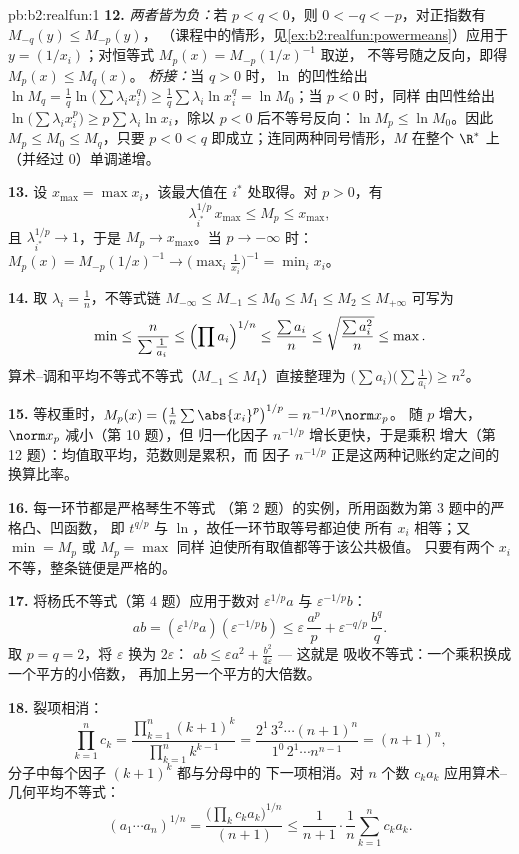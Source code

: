 \begin{solution}{pb:b2:realfun:1}
\textbf{12.} \emph{两者皆为负：}若 $p < q < 0$，则 $0 < -q <
-p$，对正指数有 $M_{-q}(y) \leq M_{-p}(y)$，
（课程中的情形，见\cref{ex:b2:realfun:powermeans}）应用于 $y =
(1/x_i)$；对恒等式 $M_p(x) = M_{-p}(1/x)^{-1}$ 取逆，
不等号随之反向，即得 $M_p(x) \leq M_q(x)$。
\emph{桥接：}当 $q > 0$ 时，$\ln$ 的凹性给出 $\ln M_q =
\frac1q\ln\bigl(\sum\lambda_ix_i^q\bigr) \geq
\frac1q\sum\lambda_i\ln x_i^q = \ln M_0$；当 $p < 0$ 时，同样
由凹性给出 $\ln\bigl(\sum\lambda_ix_i^p\bigr) \geq
p\sum\lambda_i\ln x_i$，除以 $p < 0$ 后不等号反向：$\ln M_p
\leq \ln M_0$。因此 $M_p \leq M_0 \leq M_q$，只要 $p < 0 <
q$ 即成立；连同两种同号情形，$M$ 在整个 
$\R^*$ 上（并经过 $0$）单调递增。

\textbf{13.} 设 $x_{\max} = \max x_i$，该最大值在 $i^*$ 处取得。对
$p > 0$，有
\[
\lambda_{i^*}^{1/p}\,x_{\max} \leq M_p \leq x_{\max},
\]
且 $\lambda_{i^*}^{1/p} \to 1$，于是 $M_p \to x_{\max}$。当 $p \to
-\infty$ 时：$M_p(x) = M_{-p}(1/x)^{-1} \to
\bigl(\max_i\frac1{x_i}\bigr)^{-1} = \min_ix_i$。

\textbf{14.} 取 $\lambda_i = \frac1n$，不等式链 $M_{-\infty}
\leq M_{-1} \leq M_0 \leq M_1 \leq M_2 \leq M_{+\infty}$ 可写为
\[
\min \leq \frac{n}{\sum\frac1{a_i}} \leq \Bigl(\prod
a_i\Bigr)^{1/n} \leq \frac{\sum a_i}{n} \leq
\sqrt{\frac{\sum a_i^2}{n}} \leq \max .
\]
算术–调和平均不等式不等式（$M_{-1} \leq M_1$）直接整理为
$\bigl(\sum a_i\bigr)\bigl(\sum\frac1{a_i}\bigr) \geq n^2$。

\textbf{15.} 等权重时，$M_p(x) =
\bigl(\frac1n\sum\abs{x_i}^p\bigr)^{1/p} = n^{-1/p}\norm x_p$。
随 $p$ 增大，$\norm x_p$ 减小（第 10 题），但
归一化因子 $n^{-1/p}$ 增长更快，于是乘积
增大（第 12 题）：均值取平均，范数则是累积，而
因子 $n^{-1/p}$ 正是这两种记账约定之间的
换算比率。

\textbf{16.} 每一环节都是严格琴生不等式
（第 2 题）的实例，所用函数为第 3 题中的严格凸、凹函数，
即 $t^{q/p}$ 与 $\ln$，故任一环节取等号都迫使
所有 $x_i$ 相等；又 $\min = M_p$ 或 $M_p = \max$ 同样
迫使所有取值都等于该公共极值。
只要有两个 $x_i$ 不等，整条链便是严格的。

\textbf{17.} 将杨氏不等式（第 4 题）应用于数对
$\varepsilon^{1/p}a$ 与 $\varepsilon^{-1/p}b$：
\[
ab = (\varepsilon^{1/p}a)(\varepsilon^{-1/p}b)
\leq \varepsilon\,\frac{a^p}p +
\varepsilon^{-q/p}\,\frac{b^q}q .
\]
取 $p = q = 2$，将 $\varepsilon$ 换为 $2\varepsilon$：
$ab \leq \varepsilon a^2 + \frac{b^2}{4\varepsilon}$ --- 这就是
吸收不等式：一个乘积换成一个平方的小倍数，
再加上另一个平方的大倍数。

\textbf{18.} 裂项相消：
\[
\prod_{k=1}^{n}c_k = \frac{\prod_{k=1}^n(k+1)^k}
{\prod_{k=1}^{n}k^{k-1}}
= \frac{2^1\,3^2\cdots(n+1)^n}{1^0\,2^1\cdots n^{n-1}}
= (n+1)^n,
\]
分子中每个因子 $(k+1)^k$ 都与分母中的
下一项相消。对 $n$ 个数 $c_ka_k$ 应用算术–几何平均不等式：
\[
(a_1\cdots a_n)^{1/n} =
\frac{\bigl(\prod_k c_ka_k\bigr)^{1/n}}{(n+1)}
\leq \frac{1}{n+1}\cdot\frac1n\sum_{k=1}^{n}c_ka_k .
\]


\end{solution}
